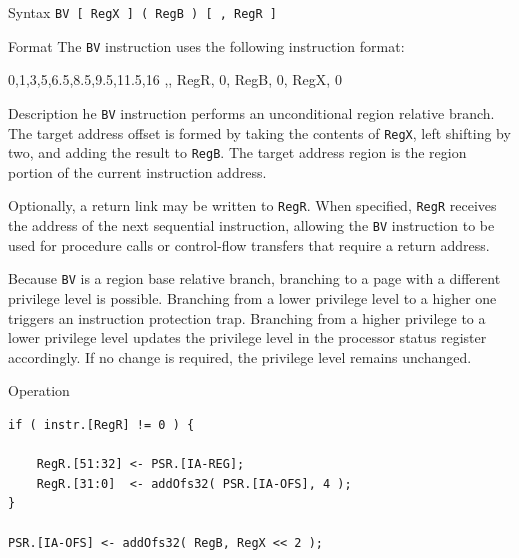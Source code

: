 \pagebreak
{}

\begin{iPageDescEntry}{Syntax}
\texttt{BV [ RegX ] (  RegB ) [ , RegR ]}
\end{iPageDescEntry}

\begin{iPageDescEntry}{Format}
The \texttt{BV} instruction uses the following instruction format: \\

\begin{flushleft}
\drawInstrFormat
    {0,1,3,5,6.5,8.5,9.5,11.5,16}
    {\OpCodeGrpBR,\OpCodeBV, RegR, 0, RegB, 0, RegX, 0}
\end{flushleft}
\end{iPageDescEntry}

\begin{iPageDescEntry}{Description}
he \texttt{BV} instruction performs an unconditional region relative branch. The target address offset is formed by taking the contents of \texttt{RegX}, left shifting by two, and adding the result to \texttt{RegB}. The target address region is  the region portion of the current instruction address.

Optionally, a return link may be written to \texttt{RegR}. When specified, \texttt{RegR} receives the address of the next sequential instruction, allowing the \texttt{BV} instruction to be used for procedure calls or control-flow transfers that require a return address.

Because \texttt{BV} is a region base relative branch, branching to a page with a different privilege level is possible. Branching from a lower privilege level to a higher one triggers an instruction protection trap. Branching from a higher privilege to a lower privilege level updates the privilege level in the processor status register accordingly. If no change is required, the privilege level remains unchanged.  
\end{iPageDescEntry}

\begin{iPageDescOpEntry}{Operation}
\begin{lstlisting}[style=iPageOpStyle]
if ( instr.[RegR] != 0 ) {
	
    RegR.[51:32] <- PSR.[IA-REG];
    RegR.[31:0]  <- addOfs32( PSR.[IA-OFS], 4 );
}

PSR.[IA-OFS] <- addOfs32( RegB, RegX << 2 );
\end{lstlisting}
\end{iPageDescOpEntry}

